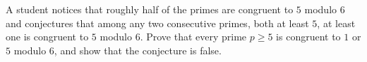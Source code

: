A student notices that roughly half of the primes are congruent to $5$ modulo $6$ and conjectures that among any two consecutive primes, both at least $5$, at least one is congruent to $5$ modulo $6$. Prove that every prime $p\ge5$ is congruent to $1$ or $5$ modulo $6$, and show that the conjecture is false.
